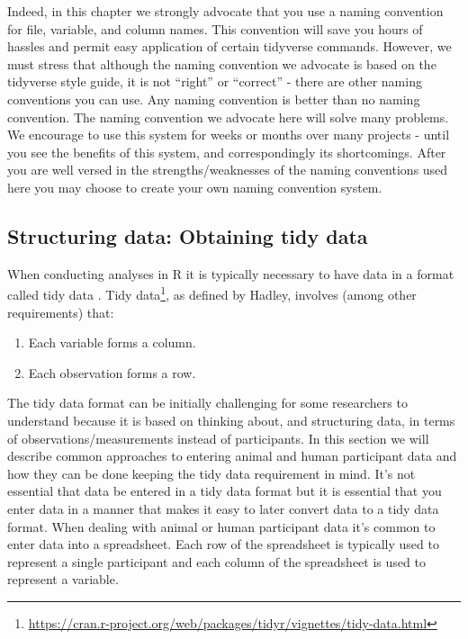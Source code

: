 \documentclass[
]{krantz}
\renewcommand{\href}[2]{#2\footnote{\url{#1}}}
\begin{document}
Indeed, in this chapter we strongly advocate that you use a naming convention for file, variable, and column names. This convention will save you hours of hassles and permit easy application of certain tidyverse commands. However, we must stress that although the naming convention we advocate is based on the tidyverse style guide, it is not ``right'' or ``correct'' - there are other naming conventions you can use. Any naming convention is better than no naming convention. The naming convention we advocate here will solve many problems. We encourage to use this system for weeks or months over many projects - until you see the benefits of this system, and correspondingly its shortcomings. After you are well versed in the strengths/weaknesses of the naming conventions used here you may choose to create your own naming convention system.

\hypertarget{structuring-data-obtaining-tidy-data}{%
\subsection{Structuring data: Obtaining tidy data}\label{structuring-data-obtaining-tidy-data}}

When conducting analyses in R it is typically necessary to have data in a format called tidy data \citep{tidy-data}. \href{https://cran.r-project.org/web/packages/tidyr/vignettes/tidy-data.html}{Tidy data}, as defined by Hadley, involves (among other requirements) that:

\begin{enumerate}
\def\labelenumi{\arabic{enumi}.}
\item
  Each variable forms a column.
\item
  Each observation forms a row.
\end{enumerate}

The tidy data format can be initially challenging for some researchers to understand because it is based on thinking about, and structuring data, in terms of observations/measurements instead of participants. In this section we will describe common approaches to entering animal and human participant data and how they can be done keeping the tidy data requirement in mind. It's not essential that data be entered in a tidy data format but it is essential that you enter data in a manner that makes it easy to later convert data to a tidy data format. When dealing with animal or human participant data it's common to enter data into a spreadsheet. Each row of the spreadsheet is typically used to represent a single participant and each column of the spreadsheet is used to represent a variable.
\end{document}
